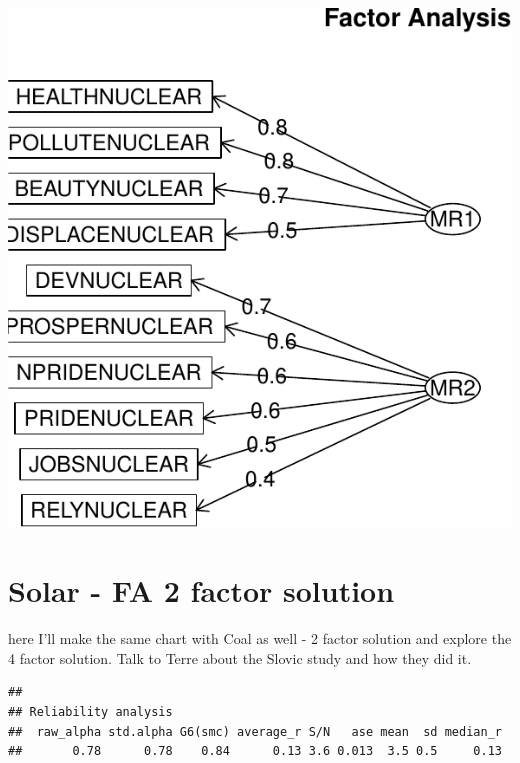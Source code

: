 \documentclass[
]{article}
\begin{document}
\includegraphics{module2PCAs_files/figure-latex/unnamed-chunk-10-1.pdf}
\newpage

\hypertarget{solar---fa-2-factor-solution}{%
\section{Solar - FA 2 factor
solution}\label{solar---fa-2-factor-solution}}

here I'll make the same chart with Coal as well - 2 factor solution and
explore the 4 factor solution. Talk to Terre about the Slovic study and
how they did it.

\begin{verbatim}
## 
## Reliability analysis   
##  raw_alpha std.alpha G6(smc) average_r S/N   ase mean  sd median_r
##       0.78      0.78    0.84      0.13 3.6 0.013  3.5 0.5     0.13
\end{verbatim}
\end{document}
